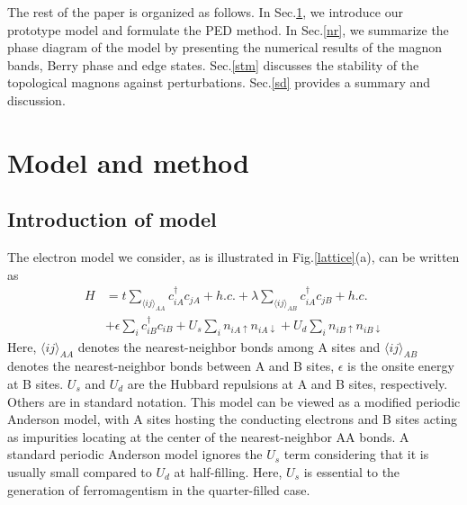 \documentclass[amsmath,superscriptaddress,showpacs,aps,prb,twocolumn]{revtex4-1}
\begin{document}
\par The rest of the paper is organized as follows. In Sec.\ref{mm}, we introduce our prototype model and formulate the PED method. In Sec.\ref{nr}, we summarize the phase diagram of the model by presenting the numerical results of the magnon bands, Berry phase and edge states. Sec.\ref{stm} discusses the stability of the topological magnons against perturbations. Sec.\ref{sd} provides a summary and discussion.

\section{Model and method}\label{mm}
\subsection{Introduction of model}
\par The electron model we consider, as is illustrated in Fig.\ref{lattice}(a), can be written as
\begin{equation}\label{model}
\begin{aligned}
    H   &   =t\sum_{\langle ij\rangle_{AA}}c_{iA}^\dagger c_{jA}+h.c.+ \lambda\sum_{\langle ij\rangle_{AB}}c_{iA}^\dagger c_{jB}+h.c.\\
        &   +\epsilon\sum_i c^\dagger_{iB}c_{iB}+U_s\sum_i n_{iA\uparrow}n_{iA\downarrow}+U_d\sum_in_{iB\uparrow}n_{iB\downarrow}
\end{aligned}
\end{equation}
Here, $\langle ij\rangle_{AA}$ denotes the nearest-neighbor bonds among A sites and $\langle ij\rangle_{AB}$ denotes the nearest-neighbor bonds between A and B sites, $\epsilon$ is the onsite energy at B sites. $U_s$ and $U_d$ are the Hubbard repulsions at A and B sites, respectively. Others are in standard notation. This model can be viewed as a modified periodic Anderson model, with A sites hosting the conducting electrons and B sites acting as impurities locating at the center of the nearest-neighbor AA bonds. A standard periodic Anderson model ignores the $U_s$ term considering that it is usually small compared to $U_d$ at half-filling. Here, $U_s$ is essential to the generation of ferromagentism in the quarter-filled case\cite{T_PRL1992}.
\end{document}
